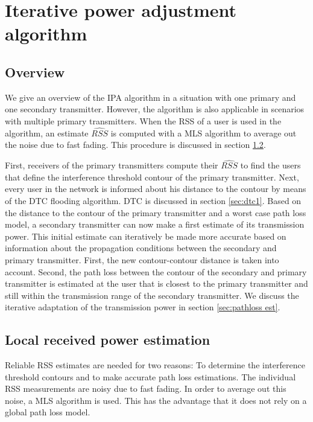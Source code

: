 
\section{Iterative power adjustment algorithm}\label{sec:ipa}

\subsection{Overview}

We give an overview of the IPA algorithm in a situation with one primary and one secondary transmitter. However, the algorithm is also applicable in scenarios with multiple primary transmitters.
When the RSS of a user is used in the algorithm, an estimate $\hat{RSS}$ is computed with a MLS algorithm to average out the noise due to fast fading. This procedure is discussed in section \ref{sec:power est}.

First, receivers of the primary transmitters compute their $\hat{RSS}$ to find the users that define the interference threshold contour of the primary transmitter. Next, every user in the network is informed about his distance to the contour by means of the DTC flooding algorithm. DTC is discussed in section \ref{sec:dtc1}. Based on the distance to the contour of the primary transmitter and a worst case path loss model, a secondary transmitter can now make a first estimate of its transmission power. This initial estimate can iteratively be made more accurate based on information about the propagation conditions between the secondary and primary transmitter. First, the new contour-contour distance is taken into account. Second, the path loss between the contour of the secondary and primary transmitter is estimated at the user that is closest to the primary transmitter and still within the transmission range of the secondary transmitter. We discuss the iterative adaptation of the transmission power in section \ref{sec:pathloss est}.

\subsection{Local received power estimation} \label{sec:power est}

Reliable RSS estimates are needed for two reasons: To determine the interference threshold contours and to make accurate path loss estimations. The individual RSS measurements are noisy due to fast fading. In order to average out this noise, a MLS algorithm is used. This has the advantage that it does not rely on a global path loss model.

